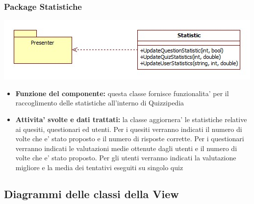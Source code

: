 \documentclass[a4paper,11pt]{article}
\begin{document}
			\subsubsection{Package Statistiche}
			\begin{center}
				\includegraphics[scale=0.6]{../images/Statistics.jpg}
			\end{center}
 			\begin{itemize}
		    	\item\textbf{Funzione del componente:} questa classe fornisce funzionalita' per il raccoglimento delle statistiche all'interno di Quizzipedia
			\item\textbf{Attivita' svolte e dati trattati:} la classe aggiornera' le statistiche relative ai quesiti, questionari ed utenti.
			Per i quesiti verranno indicati il numero di volte che e' stato proposto e il numero di risposte corrette.
			Per i questionari verranno indicati le valutazioni medie ottenute dagli utenti e il numero di volte che e' stato proposto.
			Per gli utenti verranno indicati la valutazione migliore e la media dei tentativi eseguiti su singolo quiz
			\end{itemize}
			
			\subsection{Diagrammi delle classi della View}
\end{document}
